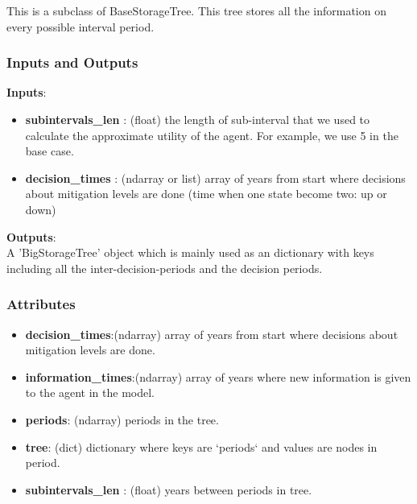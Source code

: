 \documentclass[12pt]{article}
\begin{document}
This is a subclass of BaseStorageTree. This tree stores all the information on every possible interval period.
\subsubsection{Inputs and Outputs}
\textbf{Inputs}:
\begin{itemize}
  \item \textbf{subintervals\_len} : (float) the length of sub-interval that we used to calculate the approximate utility of the agent. For example, we use 5 in the base case.
  \item \textbf{decision\_times} : (ndarray or list)	array of years from start where decisions about mitigation levels are done (time when one state become two: up or down)
\end{itemize}
\textbf{Outputs}:\\
A 'BigStorageTree' object which is mainly used as an dictionary with keys including all the inter-decision-periods and the decision periods.
\subsubsection{Attributes}
\begin{itemize}
\item \textbf{decision\_times}:(ndarray) array of years from start where decisions about mitigation levels are done.
\item \textbf{information\_times}:(ndarray) array of years where new information is given to the agent in the model.
\item \textbf{periods}: (ndarray) 	periods in the tree.
\item \textbf{tree}: (dict) dictionary where keys are `periods` and values are nodes in period.
\item \textbf{subintervals\_len} : (float) years between periods in tree.
\end{itemize}
\end{document}
